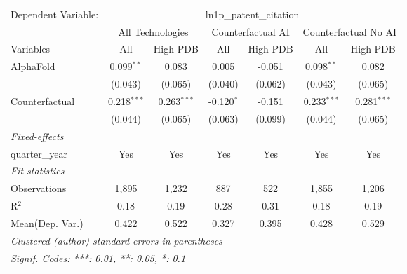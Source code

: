 \begingroup
\centering
\begin{tabular}{lcccccc}
   \tabularnewline \midrule \midrule
   Dependent Variable: & \multicolumn{6}{c}{ln1p\_patent\_citation}\\
 & \multicolumn{2}{c}{All Technologies} & \multicolumn{2}{c}{Counterfactual AI} & \multicolumn{2}{c}{Counterfactual No AI} \\
\cmidrule(lr){1-1}\cmidrule(lr){2-3} \cmidrule(lr){4-5} \cmidrule(lr){6-7}
Variables & \multicolumn{1}{c}{All} & \multicolumn{1}{c}{High PDB} & \multicolumn{1}{c}{All} & \multicolumn{1}{c}{High PDB} & \multicolumn{1}{c}{All} & \multicolumn{1}{c}{High PDB} \\
\cmidrule(lr){1-1}\cmidrule(lr){2-2} \cmidrule(lr){3-3} \cmidrule(lr){4-4} \cmidrule(lr){5-5} \cmidrule(lr){6-6} \cmidrule(lr){7-7}
   AlphaFold      & 0.099$^{**}$  & 0.083         & 0.005        & -0.051  & 0.098$^{**}$  & 0.082\\   
                  & (0.043)       & (0.065)       & (0.040)      & (0.062) & (0.043)       & (0.065)\\   
   Counterfactual & 0.218$^{***}$ & 0.263$^{***}$ & -0.120$^{*}$ & -0.151  & 0.233$^{***}$ & 0.281$^{***}$\\   
                  & (0.044)       & (0.065)       & (0.063)      & (0.099) & (0.044)       & (0.065)\\   
   \midrule
   \emph{Fixed-effects}\\
   quarter\_year  & Yes           & Yes           & Yes          & Yes     & Yes           & Yes\\  
   \midrule
   \emph{Fit statistics}\\
   Observations   & 1,895         & 1,232         & 887          & 522     & 1,855         & 1,206\\  
   R$^2$          & 0.18          & 0.19          & 0.28         & 0.31    & 0.18          & 0.19\\  
Mean(Dep. Var.) & 0.422 & 0.522 & 0.327 & 0.395 & 0.428 & 0.529 \\
   \midrule \midrule
   \multicolumn{7}{l}{\emph{Clustered (author) standard-errors in parentheses}}\\
   \multicolumn{7}{l}{\emph{Signif. Codes: ***: 0.01, **: 0.05, *: 0.1}}\\
\end{tabular}
\par\endgroup
